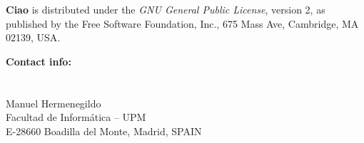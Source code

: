 \documentclass{article}
\newcommand{\inbf}[1]{{\bf #1}}
\newcommand{\concept}[1]{{\em #1}}
\begin{document}
\vfill

\inbf{Ciao} is distributed under the \concept{GNU General Public
License}, version 2, as published by the Free Software Foundation,
Inc., 675 Mass Ave, Cambridge, MA 02139, USA.

\vfill

\noindent
{\bf Contact info:}
\ \\
    \\ 
    \\ 
    Manuel Hermenegildo\\
    Facultad de Inform\'{a}tica -- UPM\\
    E-28660 Boadilla del Monte, Madrid, SPAIN
\end{document}
